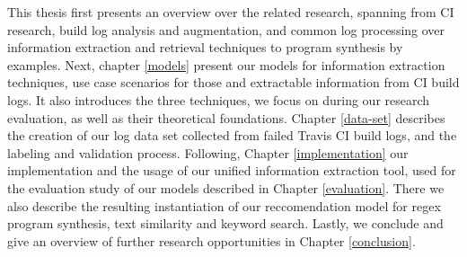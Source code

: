 \documentclass[\myrootdir/main.tex]{subfiles}
\begin{document}
This thesis first presents an overview over the related research, spanning from CI research, build log analysis and augmentation, and common  log processing over information extraction and retrieval techniques to program synthesis by examples.
Next, chapter \ref{models} present our models for information extraction techniques, use case scenarios for those and extractable information from CI build logs. It also introduces the three techniques, we focus on during our research evaluation, as well as their theoretical foundations.
Chapter \ref{data-set} describes the creation of our log data set collected from failed Travis CI build logs, and the labeling and validation process.
Following, Chapter \ref{implementation} our implementation and the usage of our unified information extraction tool, used for the evaluation study of our models described in Chapter \ref{evaluation}. There we also describe the resulting instantiation of our reccomendation model for regex program synthesis, text similarity and keyword search.
Lastly, we conclude and give an overview of further research opportunities in Chapter \ref{conclusion}.
\end{document}
